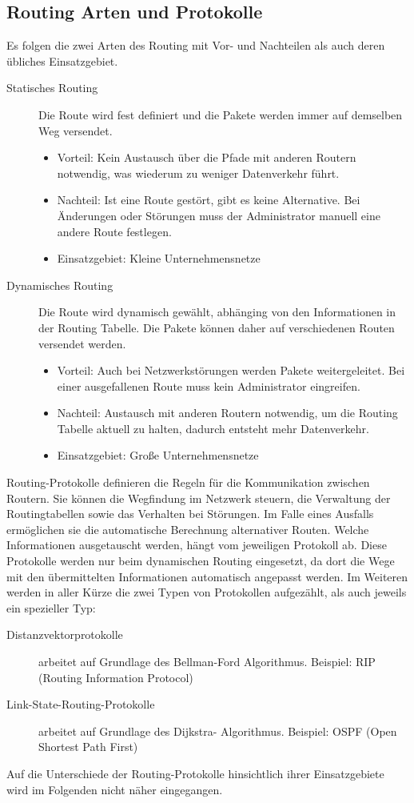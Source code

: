 	\subsection{Routing Arten und Protokolle}
	\label{sec:Routing-Arten}
	Es folgen die zwei Arten des Routing mit Vor- und Nachteilen als auch deren
	übliches Einsatzgebiet.
	\begin{description}
		\item[Statisches Routing]
		Die Route wird fest definiert und die Pakete werden immer auf demselben 
		Weg versendet. 
		\begin{itemize}
			\item Vorteil: Kein Austausch über die Pfade mit anderen Routern
			notwendig, was wiederum zu weniger Datenverkehr führt. 
			\item Nachteil: Ist eine Route gestört, gibt es keine Alternative. 
			Bei Änderungen oder Störungen muss der Administrator manuell eine andere
			Route festlegen.
			\item Einsatzgebiet: Kleine Unternehmensnetze \cite[S.72]{mandl2019}
		\end{itemize}
		\item[Dynamisches Routing]
		Die Route wird dynamisch gewählt, abhänging von den Informationen in der 
		Routing Tabelle. Die Pakete können daher auf verschiedenen Routen versendet
		werden.
		\begin{itemize}
			\item Vorteil: Auch bei Netzwerkstörungen werden Pakete weitergeleitet.
			Bei einer ausgefallenen Route muss kein Administrator eingreifen.
			\item Nachteil: Austausch mit anderen Routern notwendig, um die Routing
			Tabelle aktuell zu halten, dadurch entsteht mehr Datenverkehr.
			\item Einsatzgebiet: Große Unternehmensnetze 
		\end{itemize}
	\end{description}
	Routing-Protokolle definieren die Regeln für die Kommunikation zwischen Routern.
	Sie können die Wegfindung im Netzwerk steuern, die Verwaltung der Routingtabellen
	sowie das Verhalten bei Störungen. Im Falle eines Ausfalls ermöglichen sie die
	automatische Berechnung alternativer Routen. Welche Informationen ausgetauscht
	werden, hängt vom jeweiligen Protokoll ab. Diese Protokolle werden nur beim 
	dynamischen Routing eingesetzt, da dort die Wege mit den übermittelten Informationen
	automatisch angepasst werden. Im Weiteren werden in aller Kürze die zwei Typen von
	Protokollen aufgezählt, als auch jeweils ein spezieller Typ:
	\begin{description}
		\item[Distanzvektorprotokolle] arbeitet auf Grundlage des Bellman-Ford 
		Algorithmus. Beispiel: RIP (Routing Information Protocol) 
		\item[Link-State-Routing-Protokolle] arbeitet auf Grundlage des Dijkstra-
		Algorithmus. Beispiel: OSPF (Open Shortest Path First)
	\end{description} \cite[S.191]{baun2025}
	Auf die Unterschiede der Routing-Protokolle hinsichtlich ihrer Einsatzgebiete
	wird im Folgenden nicht näher eingegangen.
	\cite{zisler2022, baun2025, mandl2019}

